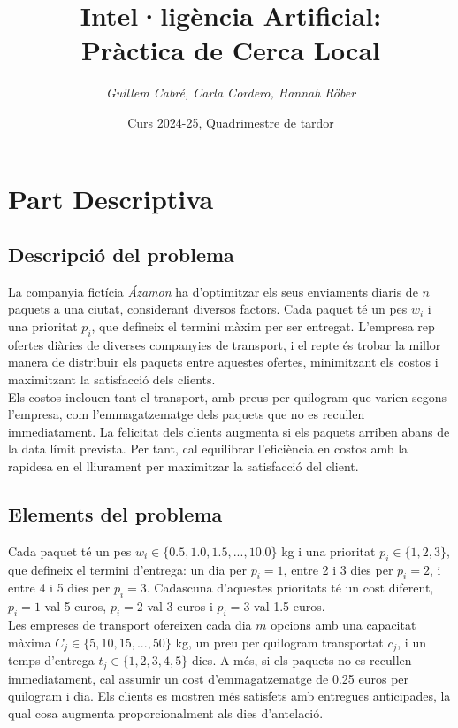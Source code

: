 \documentclass[a4paper]{article}
\title{\textbf{Intel·ligència Artificial:\\
		Pràctica de Cerca Local}}
\author{\emph{Guillem Cabré, Carla Cordero, Hannah Röber}}
\date{Curs 2024-25, Quadrimestre de tardor}
\begin{document}
	
	\begin{titlepage}
		\clearpage\maketitle
		\thispagestyle{empty}
	\end{titlepage}
	
	\tableofcontents
	\clearpage
	
	\section{Part Descriptiva}
	
	\subsection{Descripció del problema}
	
	La companyia fictícia \textit{Ázamon} ha d'optimitzar els seus enviaments diaris de $n$ paquets a una ciutat, considerant diversos factors. Cada paquet té un pes $w_i$ i una prioritat $p_i$, que defineix el termini màxim per ser entregat. L'empresa rep ofertes diàries de diverses companyies de transport, i el repte és trobar la millor manera de distribuir els paquets entre aquestes ofertes, minimitzant els costos i maximitzant la satisfacció dels clients. \\
	
	Els costos inclouen tant el transport, amb preus per quilogram que varien segons l'empresa, com l'emmagatzematge dels paquets que no es recullen immediatament. La felicitat dels clients augmenta si els paquets arriben abans de la data límit prevista. Per tant, cal equilibrar l'eficiència en costos amb la rapidesa en el lliurament per maximitzar la satisfacció del client. \\
	
	\subsection{Elements del problema}
	
	Cada paquet té un pes $w_i \in \{0.5, 1.0, 1.5, ..., 10.0\}$ kg i una prioritat $p_i \in \{1, 2, 3\}$, que defineix el termini d'entrega: un dia per $p_i = 1$, entre 2 i 3 dies per $p_i = 2$, i entre 4 i 5 dies per $p_i = 3$. Cadascuna d'aquestes prioritats té un cost diferent, $p_i = 1$ val 5 euros, $p_i = 2$ val 3 euros i $p_i = 3$ val 1.5 euros. \\
	
	Les empreses de transport ofereixen cada dia $m$ opcions amb una capacitat màxima $C_j \in \{5, 10, 15, ..., 50\}$ kg, un preu per quilogram transportat $c_j$, i un temps d'entrega $t_j \in \{1, 2, 3, 4, 5\}$ dies. A més, si els paquets no es recullen immediatament, cal assumir un cost d'emmagatzematge de 0.25 euros per quilogram i dia. Els clients es mostren més satisfets amb entregues anticipades, la qual cosa augmenta proporcionalment als dies d'antelació. \\
\end{document}

